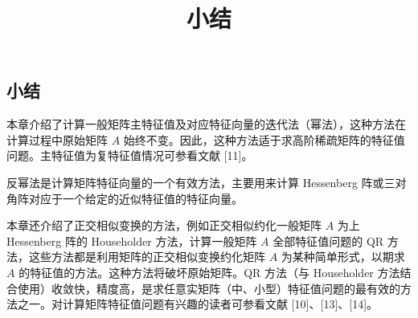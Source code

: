 \documentclass[
  10pt,
  fontset=fandol]{ctexart}
\title{小结}
\author{}
\date{}
\begin{document}
\maketitle

\subsection{小结}\label{ux5c0fux7ed3}

本章介绍了计算一般矩阵主特征值及对应特征向量的迭代法（幂法），这种方法在计算过程中原始矩阵 \(A\) 始终不变。因此，这种方法适于求高阶稀疏矩阵的特征值问题。主特征值为复特征值情况可参看文献 {[}11{]}。

反幂法是计算矩阵特征向量的一个有效方法，主要用来计算 Hessenberg 阵或三对角阵对应于一个给定的近似特征值的特征向量。

本章还介绍了正交相似变换的方法，例如正交相似约化一般矩阵 \(A\) 为上 Hessenberg 阵的 Householder 方法，计算一般矩阵 \(A\) 全部特征值问题的 QR 方法，这些方法都是利用矩阵的正交相似变换约化矩阵 \(A\) 为某种简单形式，以期求 \(A\) 的特征值的方法。这种方法将破坏原始矩阵。QR 方法（与 Householder 方法结合使用）收敛快，精度高，是求任意实矩阵（中、小型）特征值问题的最有效的方法之一。对计算矩阵特征值问题有兴趣的读者可参看文献 {[}10{]}、{[}13{]}、{[}14{]}。
\end{document}
